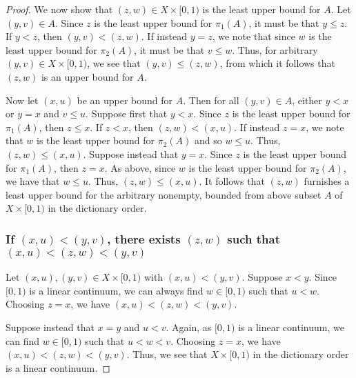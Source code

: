\begin{solution}
\begin{proof}
    We now show that $(z, w) \in X \times [0, 1)$ is the least upper bound for $A$.
    Let $(y, v) \in A$.
    Since $z$ is the least upper bound for $\pi_1(A)$, it must be that $y \leq z$.
    If $y < z$, then $(y, v) < (z, w)$.
    If instead $y = z$, we note that since $w$ is the least upper bound for $\pi_2(A)$, it must be that $v \leq w$.
    Thus, for arbitrary $(y, v) \in X \times [0, 1)$, we see that $(y, v) \leq (z, w)$, from which it follows that $(z, w)$ is an upper bound for $A$.

    Now let $(x, u)$ be an upper bound for $A$.
    Then for all $(y, v) \in A$, either $y < x$ or $y = x$ and $v \leq u$.
    Suppose first that $y < x$.
    Since $z$ is the least upper bound for $\pi_1(A)$, then $z \leq x$.
    If $z < x$, then $(z, w) < (x, u)$.
    If instead $z = x$, we note that $w$ is the least upper bound for $\pi_2(A)$ and so $w \leq u$.
    Thus, $(z, w) \leq (x, u)$.
    Suppose instead that $y = x$. Since $z$ is the least upper bound for $\pi_1(A)$, then $z = x$.
    As above, since $w$ is the least upper bound for $\pi_2(A)$, we have that $w \leq u$.
    Thus, $(z, w) \leq (x, u)$.
    It follows that $(z, w)$ furnishes a least upper bound for the arbitrary nonempty, bounded from above subset $A$ of $X \times [0, 1)$ in the dictionary order.

    \subsubsection*{If $(x, u) < (y, v)$, there exists $(z, w)$ such that $(x, u) < (z, w) < (y, v)$}
    Let $(x, u), (y, v) \in X \times [0, 1)$ with $(x, u) < (y, v)$.
    Suppose $x < y$.
    Since $[0, 1)$ is a linear continuum, we can always find $w \in [0, 1)$ such that $u < w$.
    Choosing $z = x$, we have $(x, u) < (z, w) < (y, v)$.

    Suppose instead that $x = y$ and $u < v$.
    Again, as $[0, 1)$ is a linear continuum, we can find $w \in [0, 1)$ such that $u < w < v$.
    Choosing $z = x$, we have $(x, u) < (z, w) < (y, v)$.
    Thus, we see that $X \times [0, 1)$ in the dictionary order is a linear continuum.
  \end{proof}
\end{solution}
\newpage

